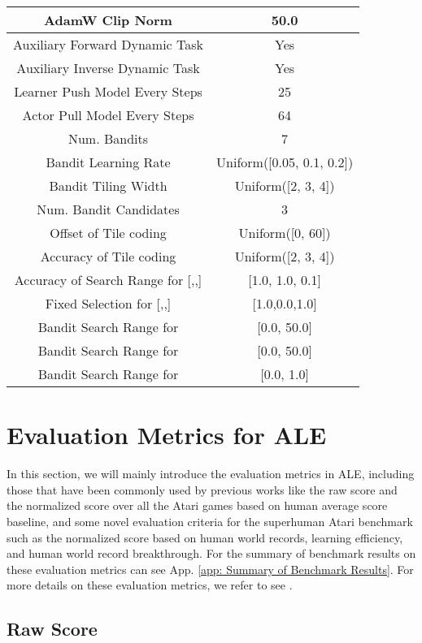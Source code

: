 \documentclass[nohyperref]{article}
\theoremstyle{plain}
\begin{document}
\begin{table}[H]
\begin{center}
\begin{tabular}{|c|c|}
\hline
AdamW Clip Norm & 50.0 \\
\hline
Auxiliary Forward Dynamic Task & Yes \\
\hline
Auxiliary Inverse Dynamic Task & Yes \\
\hline
Learner Push Model Every  Steps & 25 \\
\hline
Actor Pull Model Every  Steps & 64 \\
\hline
Num. Bandits & 7 \\
\hline
Bandit Learning Rate & Uniform([0.05, 0.1, 0.2]) \\
\hline
Bandit Tiling Width & Uniform([2, 3, 4]) \\
\hline
Num. Bandit Candidates & 3 \\
\hline
Offset of Tile coding & Uniform([0, 60]) \\
\hline
Accuracy of Tile coding & Uniform([2, 3, 4]) \\
\hline
Accuracy of Search Range for [,,]& [1.0, 1.0, 0.1]\\
\hline
Fixed Selection for [,,]&[1.0,0.0,1.0]\\
\hline
Bandit Search Range for  & [0.0, 50.0] \\
\hline
Bandit Search Range for  & [0.0, 50.0] \\
\hline
Bandit Search Range for  & [0.0, 1.0] \\
\hline
\end{tabular}
\end{center}
\end{table}
\clearpage


\section{Evaluation Metrics for ALE}
\label{app:Evaluation Metrics for ALE}
In this section, we will mainly introduce the evaluation metrics in ALE, including those that have been commonly used by previous works like the raw score and the normalized score over all the Atari games based on human average score baseline, and some novel evaluation criteria for the superhuman Atari benchmark such as the normalized score based on human world records, learning efficiency, and human world record breakthrough. For the summary of benchmark results on these evaluation metrics can see App. \ref{app: Summary of Benchmark Results}. For more details on these evaluation metrics, we refer to see \citep{review2021_atari}.

\subsection{Raw Score}
\end{document}
